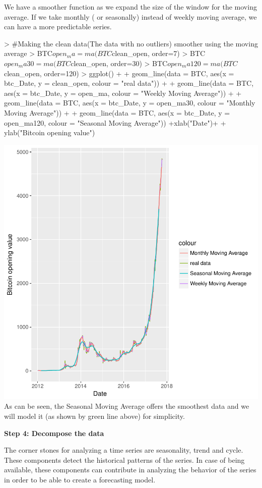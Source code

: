 \documentclass{article}
\begin{document}
We have a smoother function as we expand the size of the window for the moving average. If we take monthly ( or seasonally) instead of weekly moving average, we can have a more predictable series.
\begin{Schunk}
\begin{Sinput}
> #Making the clean data(The data with no outliers) smoother using the moving average
> BTC$open_ma = ma(BTC$clean_open, order=7) 
> BTC$open_ma30 = ma(BTC$clean_open, order=30)
> BTC$open_ma120 = ma(BTC$clean_open, order=120)
> ggplot() +
+   geom_line(data = BTC, aes(x = btc_Date, y = clean_open, colour = "real data")) +
+   geom_line(data = BTC, aes(x = btc_Date, y = open_ma,   colour = "Weekly Moving Average"))  +
+   geom_line(data = BTC, aes(x = btc_Date, y = open_ma30, colour = "Monthly Moving Average"))  +
+   geom_line(data = BTC, aes(x = btc_Date, y = open_ma120, colour = "Seasonal Moving Average"))  +xlab("Date")+
+   ylab("Bitcoin opening value")
\end{Sinput}
\end{Schunk}
\includegraphics{Report-011}
As can be seen, the Seasonal Moving Average offers the smoothest data and we will model it (as shown by green line above) for simplicity. 

\textbf{Step 4: Decompose the data}

The corner stones for analyzing a time series are seasonality, trend and cycle. These components detect the historical patterns of the series. In case of being available, these components can contribute in analyzing the behavior of the series in order to be able to create a forecasting model.
\end{document}
